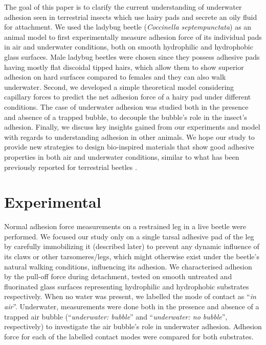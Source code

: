 \documentclass[vruler,JEB]{COB}%
\begin{document}
The goal of this paper is to clarify the current understanding of underwater adhesion seen in terrestrial insects which use hairy pads and secrete an oily fluid for attachment. We used the ladybug beetle (\emph{Coccinella septempunctata}) as an animal model to first experimentally measure adhesion force of its individual pads in air and underwater conditions, both on smooth hydrophilic and hydrophobic glass surfaces. Male ladybug beetles were chosen since they possess adhesive pads having mostly flat discoidal tipped hairs, which allow them to show superior adhesion on hard surfaces compared to females \citep{RN145} and they can also walk underwater. Second, we developed a simple theoretical model considering capillary forces to predict the net adhesion force of a hairy pad under different conditions. The case of underwater adhesion was studied both in the presence and absence of a trapped bubble, to decouple the bubble's role in the insect's adhesion. Finally, we discuss key insights gained from our experiments and model with regards to understanding adhesion in other animals. We hope our study to provide new strategies to design bio-inspired materials that show good adhesive properties in both air and underwater conditions, similar to what has been previously reported for terrestrial beetles \citep{RN87}.

\section{Experimental}

Normal adhesion force measurements on a restrained leg in a live
beetle were performed. We focused our study only on a single tarsal adhesive pad of the leg by carefully immobilizing it (described later) to prevent any dynamic influence of its claws or other tarsomeres/legs, which might otherwise exist under the beetle's natural walking conditions, influencing its adhesion. 
We characterised adhesion by the pull-off force
during detachment, tested on smooth untreated and
fluorinated glass surfaces representing hydrophilic and hydrophobic substrates
respectively. When no water was present, we labelled the mode of contact
as ``\emph{in air}''. Underwater, measurements
were done both in the presence and absence of a trapped air bubble (``\emph{underwater:
bubble}'' and ``\emph{underwater: no bubble}'', respectively) to
investigate the air bubble's role in underwater adhesion. Adhesion force
for each of the labelled contact modes were compared for both substrates.
\end{document}
